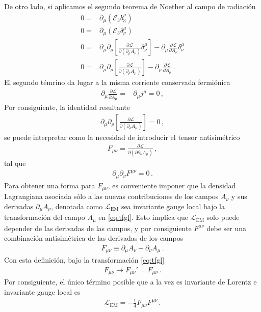 De otro lado, si aplicamos el segundo teorema de Noether al campo de radiación
\begin{align}
  0=&\partial_{\mu} \left( \mathcal{E}_3 b^{\mu}_3 \right) \nonumber\\
   0=&\partial_{\mu} \left( \mathcal{E}_3 \delta^{\mu}_\nu \right) \nonumber\\
   0=&
 \partial_{\mu} \partial_{\rho} \left[ \frac{\partial \mathcal{L}}{\partial \left(  \partial_{\rho} A_{\nu}\right)}  \delta^{\mu}_\nu \right] - \partial_{\mu} \frac{\partial \mathcal{L}}{\partial A_{\nu}}\delta^{\mu}_{\nu} \nonumber\\
   0=&
 \partial_{\mu} \partial_{\rho}\left[ \frac{\partial \mathcal{L}}{\partial \left(  \partial_{\rho} A_{\mu}\right)}  \right] - \partial_{\mu} \frac{\partial \mathcal{L}}{\partial A_{\mu}} \,.
\end{align}
El segundo témrino da lugar a la misma corriente conservada fermiónica
\begin{align}
  \partial_{\mu} \frac{\partial \mathcal{L}}{\partial A_{\mu}}=&
\partial_{\mu} j^{\mu}=0\,,
\end{align}
Por consiguiente, la identidad resultante
\begin{align}
   \partial_{\mu} \partial_{\rho}\left[ \frac{\partial \mathcal{L}}{\partial \left(  \partial_{\rho} A_{\mu}\right)}  \right]=0\,,
\end{align}
se puede interpretar como la necesidad de introducir el tensor antisimétrico
\begin{align}
  F_{\mu\nu}=\frac{\partial \mathcal{L}}{\partial \left(\partial  \partial_{\nu} A_{\mu}\right)}\,,
\end{align}
tal que
\begin{align}
  \partial_{\mu}\partial_{\nu}F^{\mu\nu}=0\,.
\end{align}
Para obtener una forma para $F_{\mu\nu}$, es conveniente imponer que la densidad Lagrangiana asociada sólo a las nuevas contribuciones de los campos $A_{\nu}$ y sus derivadas $\partial_{\mu}A_{\nu}$, denotada como $\mathcal{L}_{\text{EM}}$ 
sea invariante gauge local bajo la transformación del campo $A_{\mu}$ en \eqref{eq:tfgl}. Esto implíca que $\mathcal{L}_{\text{EM}}$  solo puede depender de las derivadas de las campos, y por consiguiente $F^{\mu\nu}$ debe ser una combinación antisimétrica de las derivadas de los campos
\begin{align}
  F_{\mu\nu}\equiv\partial_{\mu}A_{\nu}-\partial_{\nu}A_{\mu}\,.
\end{align}
Con esta definición, bajo la transformación  \eqref{eq:tfgl}
\begin{align}
  F_{\mu\nu}\to F_{\mu\nu}'=F_{\mu\nu}\,.
\end{align}
Por consiguiente, el único término posible que a la vez es invariante de Lorentz e invariante gauge local es
\begin{align}
  \mathcal{L}_{\text{EM}}=-\frac{1}{4}F_{\mu\nu}F^{\mu\nu}\,.
\end{align}


